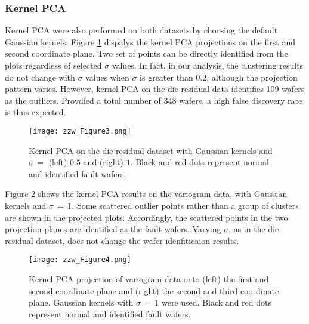 \documentclass[english]{article}
\numberwithin{equation}{section}
\numberwithin{table}{section}
\numberwithin{figure}{section}
\begin{document}
\subsubsection{Kernel PCA}
\hspace{12 pt}
Kernel PCA were also performed on both datasets by choosing the default
Gaussian kernels. Figure \ref{fig:3} dispalys the kernel PCA projections
on the first and second coordinate plane. Two set of points can be
directly identified from the plots regardless of selected $\sigma$
values. In fact, in our analysis, the clustering results do not change
with $\sigma$ values when $\sigma$ is greater than $0.2$, although
the projection pattern varies. However, kernel PCA on the die residual
data identifies 109 wafers as the outliers. Provdied a total number
of 348 wafers, a high false discovery rate is thus expected.

\begin{figure}[!tph]
\begin{centering}
\texttt{[image: zzw\_Figure3.png]}
\par\end{centering}

\caption{Kernel PCA on the die residual dataset with Gaussian kernels and $\sigma\,=$
(left) $0.5$ and (right) $1$. Black and red dots represent normal
and identified fault wafers.\label{fig:3}}
\end{figure}


Figure \ref{fig:4} shows the kernel PCA results on the variogram
data, with Gaussian kernels and $\sigma\,=\,1$. Some scattered outlier
points rather than a group of clusters are shown in the projected
plots. Accordingly, the scattered points in the two projection planes
are identified as the fault wafers. Varying $\sigma$, as in the die
residual dataset, does not change the wafer idenfiticaion results.

\begin{figure}[!tph]
\begin{centering}
\texttt{[image: zzw\_Figure4.png]}
\par\end{centering}

\caption{Kernel PCA projection of variogram data onto (left) the first and
second coordinate plane and (right) the second and third coordinate
plane. Gaussian kernels with $\sigma\,=\,1$ were used. Black and
red dots represent normal and identified fault wafers.\label{fig:4}}
\end{figure}
\end{document}
